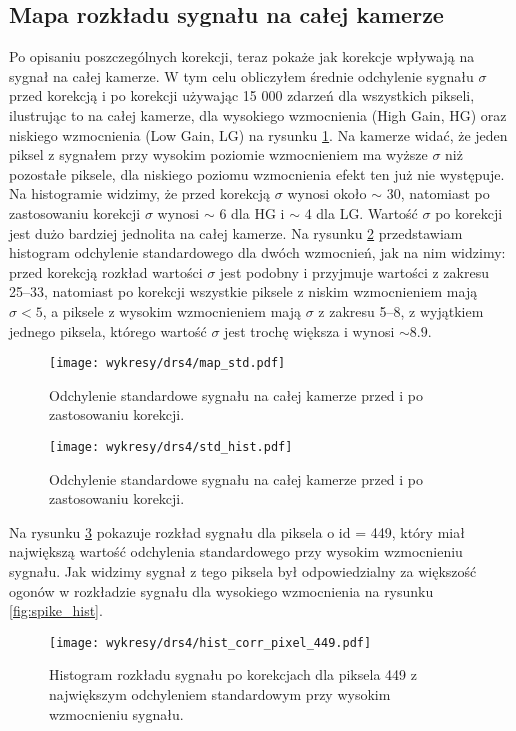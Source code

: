 \documentclass[a4paper,11pt,twoside]{article}
\begin{document}
\subsection{Mapa rozkładu sygnału na całej kamerze}
Po opisaniu poszczególnych korekcji, teraz pokaże jak korekcje wpływają na sygnał na całej kamerze. W tym celu obliczyłem średnie odchylenie sygnału $\sigma$ przed korekcją i po korekcji używając 15 000 zdarzeń dla wszystkich pikseli, ilustrując to na całej kamerze, dla  wysokiego wzmocnienia (High Gain, HG) oraz niskiego wzmocnienia (Low Gain, LG) na rysunku \ref{fig:map_cam_corr}. Na kamerze widać, że jeden piksel z sygnałem przy wysokim poziomie wzmocnieniem ma wyższe $\sigma$ niż pozostałe piksele, dla niskiego poziomu wzmocnienia efekt ten już nie występuje. Na histogramie widzimy, że przed korekcją $\sigma$ wynosi około $\sim$ 30, natomiast po zastosowaniu korekcji $\sigma$ wynosi $\sim$ 6 dla HG i $\sim$ 4 dla LG. Wartość $\sigma$ po korekcji jest dużo bardziej jednolita na całej kamerze. Na rysunku \ref{fig:hist_corr_map} przedstawiam histogram odchylenie standardowego dla dwóch wzmocnień, jak na nim widzimy: przed korekcją rozkład wartości $\sigma$ jest podobny i przyjmuje wartości z zakresu 25--33, natomiast po korekcji wszystkie piksele z niskim wzmocnieniem mają $\sigma < 5$, a piksele z wysokim wzmocnieniem mają $\sigma$ z zakresu 5--8, z wyjątkiem jednego piksela, którego wartość $\sigma$ jest trochę większa i wynosi $\sim 8.9$.
\begin{figure}[H] 
\centering
\texttt{[image: wykresy/drs4/map\_std.pdf]}
\caption{Odchylenie standardowe sygnału na całej kamerze przed i po zastosowaniu korekcji.}
\label{fig:map_cam_corr}
\end{figure}
\begin{figure}[H] 
\centering
\texttt{[image: wykresy/drs4/std\_hist.pdf]}
\caption{Odchylenie standardowe sygnału na całej kamerze przed i po zastosowaniu korekcji.}
\label{fig:hist_corr_map}
\end{figure}
Na rysunku \ref{fig:hist_corr_bad_pixel} pokazuje rozkład sygnału dla piksela o id = 449, który miał największą wartość odchylenia standardowego przy wysokim wzmocnieniu sygnału. Jak widzimy sygnał z tego piksela był odpowiedzialny za większość ogonów w rozkładzie sygnału dla wysokiego wzmocnienia na rysunku \ref{fig:spike_hist}.
\begin{figure}[H] 
\centering
\texttt{[image: wykresy/drs4/hist\_corr\_pixel\_449.pdf]}
\caption{Histogram rozkładu sygnału po korekcjach dla piksela 449 z największym odchyleniem standardowym przy wysokim wzmocnieniu sygnału.}
\label{fig:hist_corr_bad_pixel}
\end{figure}
\end{document}
